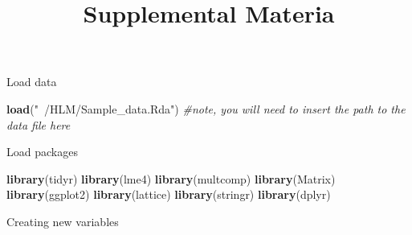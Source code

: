 \documentclass[]{article}
\title{Supplemental Materia}
\author{}
\date{}
\newenvironment{Shaded}{\begin{snugshade}}{\end{snugshade}}
\newcommand{\KeywordTok}[1]{\textcolor[rgb]{0.13,0.29,0.53}{\textbf{#1}}}
\newcommand{\StringTok}[1]{\textcolor[rgb]{0.31,0.60,0.02}{#1}}
\newcommand{\CommentTok}[1]{\textcolor[rgb]{0.56,0.35,0.01}{\textit{#1}}}
\newcommand{\NormalTok}[1]{#1}
\begin{document}
\maketitle

Load data

\begin{Shaded}
\begin{Highlighting}[]
\KeywordTok{load}\NormalTok{(}\StringTok{"~/HLM/Sample_data.Rda"}\NormalTok{) }\CommentTok{#note, you will need to insert the path to the data file here}
\end{Highlighting}
\end{Shaded}

Load packages

\begin{Shaded}
\begin{Highlighting}[]
\KeywordTok{library}\NormalTok{(tidyr)}
\KeywordTok{library}\NormalTok{(lme4)}
\KeywordTok{library}\NormalTok{(multcomp)}
\KeywordTok{library}\NormalTok{(Matrix)}
\KeywordTok{library}\NormalTok{(ggplot2)}
\KeywordTok{library}\NormalTok{(lattice)}
\KeywordTok{library}\NormalTok{(stringr)}
\KeywordTok{library}\NormalTok{(dplyr) }
\end{Highlighting}
\end{Shaded}

Creating new variables
\end{document}

